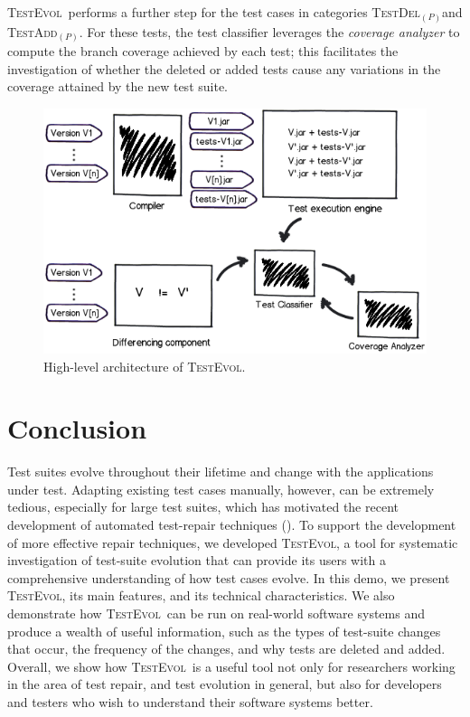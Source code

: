 \documentclass[conference]{IEEEtran}
\newcommand{\mt}{\mathit}
\newcommand{\catdelp}{\textsc{TestDel}$_\mt{(P)}$}
\newcommand{\cataddp}{\textsc{TestAdd}$_\mt{(P)}$}
\newcommand{\tool}{\textsc{TestEvol}\xspace}
\begin{document}
\tool\ performs a further step for the test cases in categories
\catdelp{}and \cataddp{}. For these tests, the test classifier
leverages the \emph{coverage analyzer} to compute the branch coverage
achieved by each test; this facilitates the investigation of whether
the deleted or added tests cause any variations in the coverage
attained by the new test suite.

\begin{figure}
	\centering
	\includegraphics[width=\columnwidth]{architecture.png}
        \vspace*{-16pt}
	\caption{High-level architecture of \tool.}
        \vspace*{-8pt}
	\label{fig:trex}
\end{figure}

\vspace*{-8pt}
\section{Conclusion}
\label{sec:summary}

Test suites evolve throughout their lifetime and change with the
applications under test. Adapting existing test cases manually,
however, can be extremely tedious, especially for large test suites,
which has motivated the recent development of automated test-repair
techniques (\eg \cite{Daniel:2009, Daniel:2010, Mirzaaghaei:2012}).
To support the development of more effective repair techniques, we
developed \tool, a tool for systematic investigation of test-suite
evolution that can provide its users with a comprehensive
understanding of how test cases evolve. In this demo, we present
\tool, its main features, and its technical characteristics. We also
demonstrate how \tool\ can be run on real-world software systems and
produce a wealth of useful information, such as the types of
test-suite changes that occur, the frequency of the changes, and why
tests are deleted and added.  Overall, we show how \tool\ is a useful
tool not only for researchers working in the area of test repair, and
test evolution in general, but also for developers and testers who
wish to understand their software systems better.




{\footnotesize

}
\end{document}
